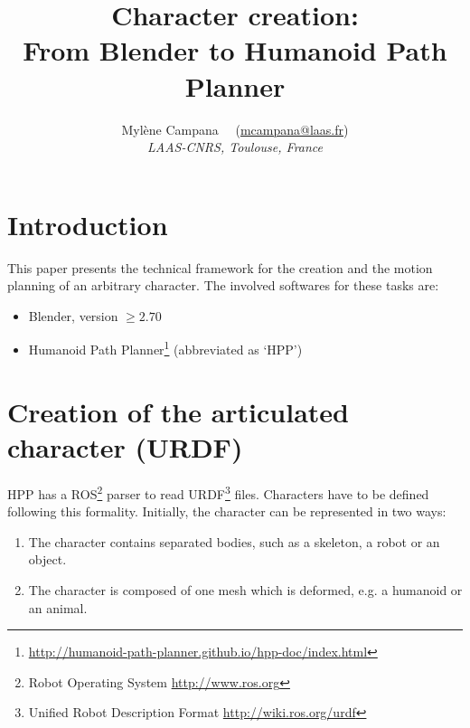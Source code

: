 \documentclass[12pt]{article}
\begin{document}
\graphicspath{{images/}}

\title{Character creation: \\ From Blender to Humanoid Path Planner}

\date{}

\author{Myl\`{e}ne Campana \ \ (\href{mailto:mcampana@laas.fr}{mcampana@laas.fr})
\\\vspace{6pt}
{\em{LAAS-CNRS, Toulouse, France}}
}
\maketitle

\tableofcontents

\newpage

\section{Introduction}
This paper presents the technical framework for the creation and the motion planning of an arbitrary character.
The involved softwares for these tasks are:
\begin{itemize}
	\item Blender, version $\geq 2.70$
	\item Humanoid Path Planner\footnote{\url{http://humanoid-path-planner.github.io/hpp-doc/index.html}} (abbreviated as `HPP')
\end{itemize}






\section{Creation of the articulated character (URDF)}
HPP has a ROS\footnote{Robot Operating System \url{http://www.ros.org}} parser to read URDF\footnote{Unified Robot Description Format \url{http://wiki.ros.org/urdf}} files. Characters have to be defined following this formality.
Initially, the character can be represented in two ways:

\begin{enumerate}
	\item The character contains separated bodies, such as a skeleton, a robot or an object.
	\item The character is composed of one mesh which is deformed, e.g. a humanoid or an animal.
\end{enumerate}
\end{document}
